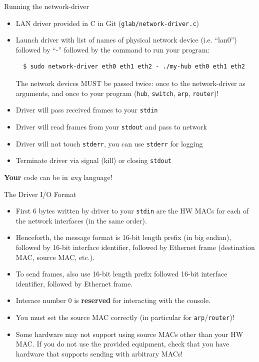 \documentclass{beamer}
\begin{document}
\begin{frame}[fragile]{Running the network-driver}
\begin{itemize}
\item LAN driver provided in C in Git ({\tt glab/network-driver.c})
\item Launch driver with list of names of physical network device (i.e. ``lan0'')
      followed by ``-'' followed by the command to run your program:
\begin{verbatim}
  $ sudo network-driver eth0 eth1 eth2 - ./my-hub eth0 eth1 eth2
\end{verbatim}
  The network devices MUST be passed twice: once to the network-driver
  as arguments, and once to your program ({\tt hub}, {\tt switch}, {\tt arp}, {\tt router})!
\item Driver will pass received frames to your {\tt stdin}
\item Driver will read frames from your {\tt stdout} and pass to network
\item Driver will not touch {\tt stderr}, you can use {\tt stderr} for logging
\item Terminate driver via signal (kill) or closing {\tt stdout}
\end{itemize}
\begin{center}
{\bf Your} code can be in {\em any} language!
\end{center}
\end{frame}


\begin{frame}{The Driver I/O Format}
\begin{itemize}
\item First 6 bytes written by driver to your {\tt stdin} are the HW MACs
      for each of the network interfaces (in the same order).
\item Henceforth, the message format is 16-bit length prefix (in big endian),
      followed by 16-bit interface identifier,
      followed by Ethernet frame (destination MAC, source MAC, etc.).
\item To send frames, also use 16-bit length prefix followed
      16-bit interface identifier, followed by Ethernet frame.
\item Interace number 0 is {\bf reserved} for interacting with the console.
\item You must set the source MAC correctly (in particular for {\tt arp}/{\tt router})!
\item Some hardware may not support using source MACs other than your
      HW MAC. If you do not use the provided equipment, check that you have
      hardware that supports sending with arbitrary MACs!
\end{itemize}
\end{frame}
\end{document}
